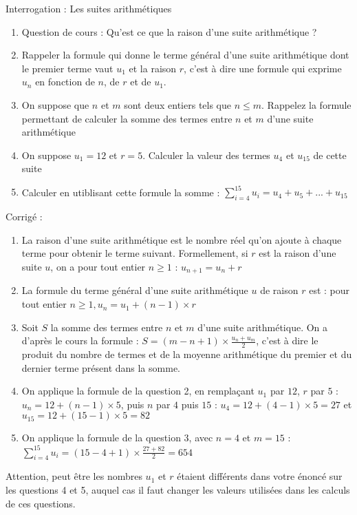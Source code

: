 \documentclass[10pt,a4paper]{exam}
\date{}
\begin{document}
Interrogation : Les suites arithmétiques
\begin{enumerate}
    \item Question de cours : Qu'est ce que la raison d'une suite arithmétique ?
    \item Rappeler la formule qui donne le terme général d'une suite arithmétique dont le premier terme vaut $u_1$ et la raison $r$, c'est à dire une formule qui exprime $u_n$ en fonction de $n$, de $r$ et de $u_1$.
    \item On suppose que $n$ et $m$ sont deux entiers tels que $n\leq m$.  Rappelez la formule permettant de calculer la somme des termes entre $n$ et $m$ d'une suite arithmétique
    \item On suppose $u_1 = 12$ et $r = 5$.  Calculer la valeur des termes $u_4$ et $u_{15}$ de cette suite
    \item Calculer en utiblisant cette formule la somme :  $\sum_{i=4}^{15} u_i = u_4 + u_5 + ... + u_{15}$
\end{enumerate}

\vspace{10mm}


Corrigé :
\begin{enumerate}
    \item La raison d'une suite arithmétique est le nombre réel qu'on ajoute à chaque terme pour obtenir le terme suivant. Formellement, si $r$ est la raison d'une suite $u$, on a pour tout entier $n \geq 1$ : $u_{n+1}=u_n + r$
    \item La formule du terme général d'une suite arithmétique $u$ de raison $r$ est : pour tout entier $n \geq 1, u_n = u_1 + (n-1)\times r$
    \item Soit $S$ la somme des termes entre $n$ et $m$ d'une suite arithmétique. On a d'après le cours la formule : $S = (m-n+1) \times \frac{u_n+u_m}{2}$, c'est à dire le produit du nombre de termes et de la moyenne arithmétique du premier et du dernier terme présent dans la somme.
    \item On applique la formule de la question 2, en remplaçant $u_1$ par $12$, $r$ par $5$ : $u_n=12 + (n-1) \times 5$, puis $n$ par $4$ puis $15$ :   $u_4 = 12 + (4-1) \times 5 = 27$ et $u_{15} = 12 + (15-1) \times 5 = 82$
    \item On applique la formule de la question 3, avec $n=4$ et $m=15$ : $\sum_{i=4}^{15} u_i = (15 -4+1) \times \frac{27 + 82}{2} = 654$
\end{enumerate}

Attention, peut être les nombres $u_1$ et $r$ étaient différents dans votre énoncé sur les questions 4 et 5, auquel cas il faut changer les valeurs utilisées dans les calculs de ces questions.
\end{document}
